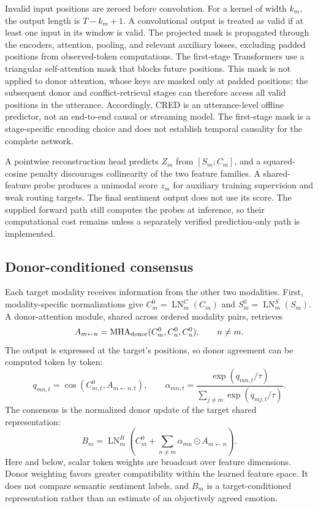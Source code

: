 \documentclass[review,12pt]{elsarticle}
\newcommand{\MHA}{\operatorname{MHA}}
\newcommand{\LN}{\operatorname{LN}}
\begin{document}
Invalid input positions are zeroed before convolution. For a kernel of width $k_m$, the output length is $T-k_m+1$. A convolutional output is treated as valid if at least one input in its window is valid. The projected mask is propagated through the encoders, attention, pooling, and relevant auxiliary losses, excluding padded positions from observed-token computations. The first-stage Transformers use a triangular self-attention mask that blocks future positions. This mask is not applied to donor attention, whose keys are masked only at padded positions; the subsequent donor and conflict-retrieval stages can therefore access all valid positions in the utterance. Accordingly, CRED is an utterance-level offline predictor, not an end-to-end causal or streaming model. The first-stage mask is a stage-specific encoding choice and does not establish temporal causality for the complete network.

A pointwise reconstruction head predicts $Z_m$ from $[S_m;C_m]$, and a squared-cosine penalty discourages collinearity of the two feature families. A shared-feature probe produces a unimodal score $z_m$ for auxiliary training supervision and weak routing targets. The final sentiment output does not use its score. The supplied forward path still computes the probes at inference, so their computational cost remains unless a separately verified prediction-only path is implemented.

\subsection{Donor-conditioned consensus}
Each target modality receives information from the other two modalities. First, modality-specific normalizations give $C_m^0=\LN_m^C(C_m)$ and $S_m^0=\LN_m^S(S_m)$. A donor-attention module, shared across ordered modality pairs, retrieves
\begin{equation}
A_{m\leftarrow n}=\MHA_{\rm donor}(C_m^0,C_n^0,C_n^0),\qquad n\ne m.
\label{eq:donor}
\end{equation}
The output is expressed at the target's positions, so donor agreement can be computed token by token:
\begin{equation}
q_{mn,t}=\cos(C_{m,t}^0,A_{m\leftarrow n,t}),\qquad
\alpha_{mn,t}=\frac{\exp(q_{mn,t}/\tau)}{\sum_{j\ne m}\exp(q_{mj,t}/\tau)}.
\label{eq:agreement}
\end{equation}
The consensus is the normalized donor update of the target shared representation:
\begin{equation}
B_m=\LN_m^B\left(C_m^0+\sum_{n\ne m}\alpha_{mn}\odot A_{m\leftarrow n}\right).
\label{eq:consensus}
\end{equation}
Here and below, scalar token weights are broadcast over feature dimensions. Donor weighting favors greater compatibility within the learned feature space. It does not compare semantic sentiment labels, and $B_m$ is a target-conditioned representation rather than an estimate of an objectively agreed emotion.
\end{document}
